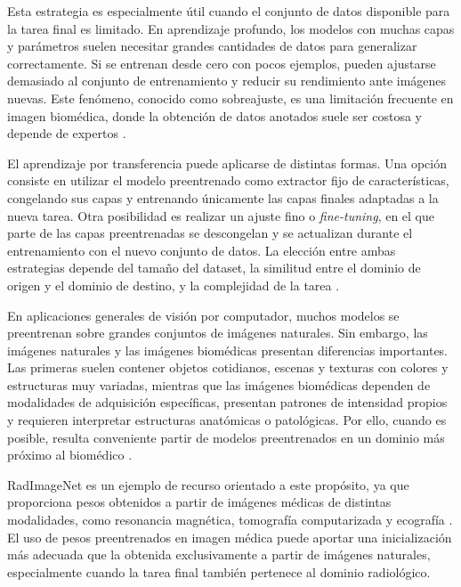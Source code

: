 Esta estrategia es especialmente útil cuando el conjunto de datos disponible para la tarea final es limitado. En aprendizaje profundo, los modelos con muchas capas y parámetros suelen necesitar grandes cantidades de datos para generalizar correctamente. Si se entrenan desde cero con pocos ejemplos, pueden ajustarse demasiado al conjunto de entrenamiento y reducir su rendimiento ante imágenes nuevas. Este fenómeno, conocido como sobreajuste, es una limitación frecuente en imagen biomédica, donde la obtención de datos anotados suele ser costosa y depende de expertos \citep{tajbakhsh2016cnn,hesamian2019deep}.

El aprendizaje por transferencia puede aplicarse de distintas formas. Una opción consiste en utilizar el modelo preentrenado como extractor fijo de características, congelando sus capas y entrenando únicamente las capas finales adaptadas a la nueva tarea. Otra posibilidad es realizar un ajuste fino o \textit{fine-tuning}, en el que parte de las capas preentrenadas se descongelan y se actualizan durante el entrenamiento con el nuevo conjunto de datos. La elección entre ambas estrategias depende del tamaño del dataset, la similitud entre el dominio de origen y el dominio de destino, y la complejidad de la tarea \citep{yosinski2014transferable,tajbakhsh2016cnn}.

En aplicaciones generales de visión por computador, muchos modelos se preentrenan sobre grandes conjuntos de imágenes naturales. Sin embargo, las imágenes naturales y las imágenes biomédicas presentan diferencias importantes. Las primeras suelen contener objetos cotidianos, escenas y texturas con colores y estructuras muy variadas, mientras que las imágenes biomédicas dependen de modalidades de adquisición específicas, presentan patrones de intensidad propios y requieren interpretar estructuras anatómicas o patológicas. Por ello, cuando es posible, resulta conveniente partir de modelos preentrenados en un dominio más próximo al biomédico \citep{tajbakhsh2016cnn,mei2022radimagenet}.

RadImageNet es un ejemplo de recurso orientado a este propósito, ya que proporciona pesos obtenidos a partir de imágenes médicas de distintas modalidades, como resonancia magnética, tomografía computarizada y ecografía \citep{mei2022radimagenet}. El uso de pesos preentrenados en imagen médica puede aportar una inicialización más adecuada que la obtenida exclusivamente a partir de imágenes naturales, especialmente cuando la tarea final también pertenece al dominio radiológico.

